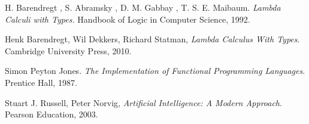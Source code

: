 \documentclass[conference]{IEEEtran}
\begin{document}
\begin{thebibliography}{22}
H. Barendregt , S. Abramsky , D. M. Gabbay , T. S. E. Maibaum.
\emph{Lambda Calculi with Types.} 
Handbook of Logic in Computer Science, 1992. 


  Henk Barendregt, Wil Dekkers, Richard Statman,
  \emph{Lambda Calculus With Types}.
  Cambridge University Press,
  2010. 

Simon Peyton Jones. 
\emph{The Implementation of Functional Programming Languages}. 
Prentice Hall, 1987.


	Stuart J. Russell, Peter Norvig,
	\emph{Artificial Intelligence: A Modern Approach}.
	Pearson Education,
	2003. 


\end{thebibliography}

\end{document}
